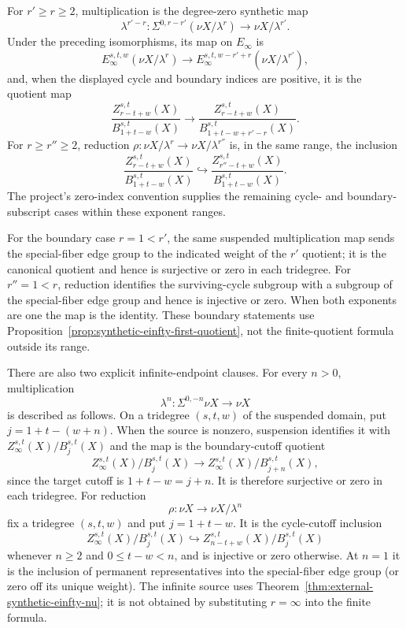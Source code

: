 \begin{proposition}
  \label{prop:synthetic-einfty-map-compatibility}
  \notready
  For $r'\ge r\ge2$, multiplication is the degree-zero synthetic map
  \[
    \lambda^{r'-r}:
    \Sigma^{0,r-r'}(\nu X/\lambda^r)\longrightarrow\nu X/\lambda^{r'}.
  \]
  Under the preceding isomorphisms, its map on $E_\infty$ is
  \[
    E_\infty^{s,t,w}(\nu X/\lambda^r)
      \longrightarrow
    E_\infty^{s,t,w-r'+r}(\nu X/\lambda^{r'}),
  \]
  and, when the displayed cycle and boundary indices are positive, it is the
  quotient map
  \[
    \frac{Z_{r-t+w}^{s,t}(X)}{B_{1+t-w}^{s,t}(X)}
      \longrightarrow
    \frac{Z_{r-t+w}^{s,t}(X)}{B_{1+t-w+r'-r}^{s,t}(X)}.
  \]
  For $r\ge r''\ge2$, reduction
  $\rho:\nu X/\lambda^r\to\nu X/\lambda^{r''}$
  is, in the same range, the inclusion
  \[
    \frac{Z_{r-t+w}^{s,t}(X)}{B_{1+t-w}^{s,t}(X)}
      \hookrightarrow
    \frac{Z_{r''-t+w}^{s,t}(X)}{B_{1+t-w}^{s,t}(X)}.
  \]
  The project's zero-index convention supplies the remaining cycle- and
  boundary-subscript cases within these exponent ranges.

  For the boundary case $r=1<r'$, the same suspended multiplication map sends
  the special-fiber edge group to the indicated weight of the $r'$ quotient;
  it is the canonical quotient and hence is surjective or zero in each
  tridegree.  For $r''=1<r$, reduction identifies the surviving-cycle subgroup
  with a subgroup of the special-fiber edge group and hence is injective or
  zero.  When both exponents are one the map is the identity.  These boundary
  statements use Proposition~\ref{prop:synthetic-einfty-first-quotient}, not
  the finite-quotient formula outside its range.

  There are also two explicit infinite-endpoint clauses.  For every $n>0$,
  multiplication
  \[
    \lambda^n:\Sigma^{0,-n}\nu X\longrightarrow\nu X
  \]
  is described as follows.  On a tridegree $(s,t,w)$ of the suspended domain,
  put $j=1+t-(w+n)$.  When the source is nonzero, suspension identifies it
  with $Z_\infty^{s,t}(X)/B_j^{s,t}(X)$ and the map is the
  boundary-cutoff quotient
  \[
    Z_\infty^{s,t}(X)/B_j^{s,t}(X)
      \longrightarrow
    Z_\infty^{s,t}(X)/B_{j+n}^{s,t}(X),
  \]
  since the target cutoff is $1+t-w=j+n$.  It is therefore surjective or zero
  in each tridegree.  For reduction
  \[
    \rho:\nu X\longrightarrow\nu X/\lambda^n
  \]
  fix a tridegree $(s,t,w)$ and put $j=1+t-w$.  It is the cycle-cutoff inclusion
  \[
    Z_\infty^{s,t}(X)/B_j^{s,t}(X)
      \hookrightarrow
    Z_{n-t+w}^{s,t}(X)/B_j^{s,t}(X)
  \]
  whenever $n\ge2$ and $0\le t-w<n$, and is injective or zero otherwise.  At
  $n=1$ it is the inclusion of permanent representatives
  into the special-fiber edge group (or zero off its unique weight).  The
  infinite source uses Theorem~\ref{thm:external-synthetic-einfty-nu}; it is
  not obtained by substituting $r=\infty$ into the finite formula.
\end{proposition}

